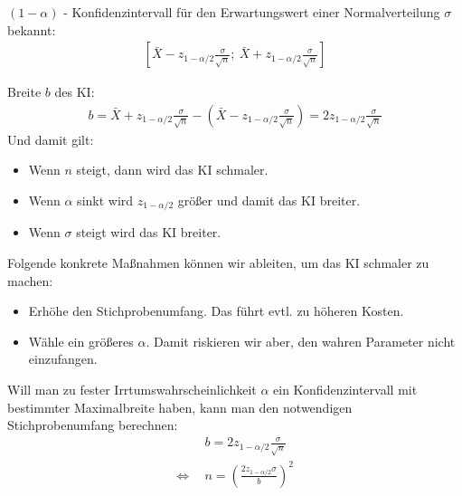 \documentclass[t,11pt,aspectratio=169]{beamer}
\begin{document}
\begin{frame}
\begin{alertblock}{$(1-\alpha)$ - Konfidenzintervall für den Erwartungswert einer Normalverteilung}
$\sigma$ bekannt:
\begin{align*}
\left[ \bar{X} - z_{1-\alpha/2} \frac{\sigma}{\sqrt{n}};~\bar{X} + z_{1-\alpha/2} \frac{\sigma}{\sqrt{n}}  \right]
\end{align*}
\end{alertblock}
Breite $b$ des KI:
\begin{align*}
b = \bar{X} + z_{1-\alpha/2} \frac{\sigma}{\sqrt{n}} -  \left(\bar{X} - z_{1-\alpha/2} \frac{\sigma}{\sqrt{n}} \right)= 2z_{1-\alpha/2}\frac{\sigma}{\sqrt{n}}
\end{align*}
\pause Und damit gilt:
\begin{itemize}
	\item Wenn $n$ steigt, dann wird das KI schmaler.
	\item Wenn $\alpha$ sinkt wird $z_{1-\alpha/2}$ größer und damit das KI breiter.
	\item Wenn $\sigma$ steigt wird das KI breiter.
\end{itemize}
\end{frame}

\begin{frame}
Folgende konkrete Maßnahmen können wir ableiten, um das KI schmaler zu machen:
\begin{itemize}
	\item Erhöhe den Stichprobenumfang. Das führt evtl. zu höheren Kosten.
	\item Wähle ein größeres $\alpha$. Damit riskieren wir aber, den wahren Parameter nicht einzufangen.
\end{itemize}
\end{frame}

\begin{frame}
Will man zu fester Irrtumswahrscheinlichkeit $\alpha$ ein Konfidenzintervall mit bestimmter Maximalbreite haben, kann man den notwendigen Stichprobenumfang berechnen:
\begin{align*}
&b = 2z_{1-\alpha/2}\frac{\sigma}{\sqrt{n}} \\
\Leftrightarrow ~~ & n = \left(\frac{2z_{1-\alpha/2}\sigma}{b} \right )^2
\end{align*}
\end{frame}
\end{document}
